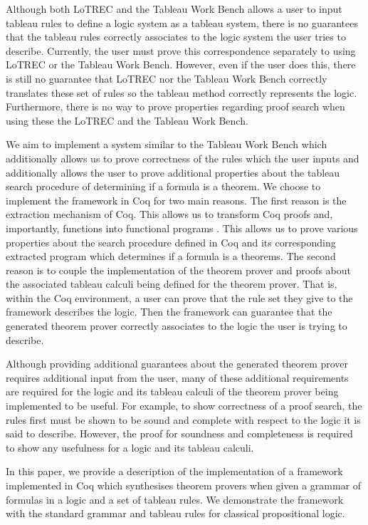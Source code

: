 \documentclass{llncs}
\begin{document}
Although both LoTREC and the Tableau Work Bench allows a user to input
tableau rules to define a logic system as a tableau system, there is no
guarantees that the tableau rules correctly associates to the logic system the
user tries to describe. Currently, the user must prove this correspondence
separately to using LoTREC or the Tableau Work Bench. However, even if the user
does this, there is still no guarantee that LoTREC nor the Tableau Work Bench
correctly translates these set of rules so the tableau method correctly
represents the logic. Furthermore, there is no way to prove properties
regarding proof search when using these the LoTREC and the Tableau Work Bench.

We aim to implement a system similar to the Tableau Work Bench which
additionally allows us to prove correctness of the rules which the user inputs
and additionally allows the user to prove additional properties about the
tableau search procedure of determining if a formula is a theorem. We choose to
implement the framework in Coq for two main reasons. The
first reason is the extraction mechanism of Coq. This allows us to transform
Coq proofs and, importantly, functions into functional programs
\cite{letouzey2008extraction}.  This allows us to prove various properties
about the search procedure defined in Coq and its corresponding extracted
program which determines if a formula is a theorems. The second reason is to
couple the implementation of the theorem prover and proofs about the associated
tableau calculi being defined for the theorem prover. That is, within the Coq
environment, a user can prove that the rule set they give to the framework
describes the logic. Then the framework can guarantee that the generated
theorem prover correctly associates to the logic the user is trying to
describe.

Although providing additional guarantees about the generated theorem prover
requires additional input from the user, many of these additional requirements
are required for the logic and its tableau calculi of the theorem prover being
implemented to be useful. For example, to show correctness of a proof search,
the rules first must be shown to be sound and complete with respect to the
logic it is said to describe. However, the proof for soundness and completeness
is required to show any usefulness for a logic and its tableau calculi.

In this paper, we provide a description of the implementation of a framework
implemented in Coq which synthesises theorem provers when given a grammar of
formulas in a logic and a set of tableau rules. We demonstrate the framework
with the standard grammar and tableau rules for classical propositional logic.
%
\end{document}
